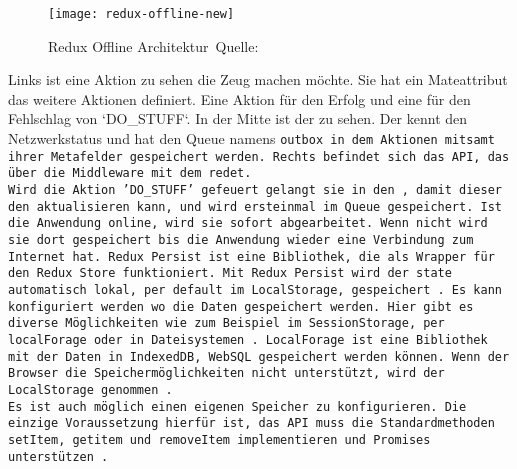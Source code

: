 %
\begin{figure}[h]
  \centering
  \texttt{[image: redux-offline-new]}
  \grayRule
  \caption[Redux Offline]{Redux Offline Architektur~Quelle:~\cite{redux-offline}}
  \label{fig:redux-offline}
\end{figure}
%
Links ist eine Aktion zu sehen die Zeug machen möchte. Sie hat ein Mateattribut das weitere Aktionen definiert. Eine Aktion für den Erfolg und eine für den Fehlschlag von `DO\_STUFF`.
In der Mitte ist der  zu sehen. Der  kennt den Netzwerkstatus und hat den \gls{Queue} namens \tt{outbox} in dem Aktionen mitsamt ihrer Metafelder gespeichert werden. Rechts befindet sich das \gls{API}, das über die \gls{Middleware} mit dem  redet.\\
Wird die Aktion 'DO\_STUFF' gefeuert gelangt sie in den , damit dieser den  aktualisieren kann, und wird ersteinmal im \gls{Queue} gespeichert. Ist die Anwendung online, wird sie sofort abgearbeitet. Wenn nicht wird sie dort gespeichert bis die Anwendung wieder eine Verbindung zum Internet hat.   
%
%
Redux Persist ist eine Bibliothek, die als Wrapper für den Redux Store funktioniert. Mit Redux Persist wird der \tt{state} automatisch lokal, per default im LocalStorage, gespeichert~\cite{redux-persist}.
Es kann konfiguriert werden wo die Daten gespeichert werden. Hier gibt es diverse Möglichkeiten wie zum Beispiel im SessionStorage, per localForage oder in Dateisystemen~\cite{redux-persist-gh}. LocalForage ist eine Bibliothek mit der Daten in IndexedDB, WebSQL gespeichert werden können. Wenn der Browser die Speichermöglichkeiten nicht unterstützt, wird der LocalStorage genommen~\cite{localforage}.\\
Es ist auch möglich einen eigenen Speicher zu konfigurieren. Die einzige Voraussetzung hierfür ist, das \gls{API} muss die Standardmethoden \tt{setItem}, \tt{getitem} und \tt{removeItem} implementieren und Promises unterstützen~\cite{redux-persist-gh}.
%
%
